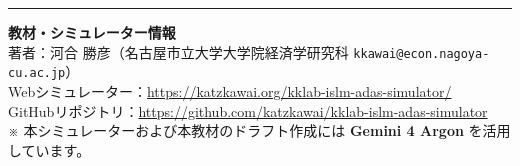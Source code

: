 \documentclass[lualatex,a4paper,11pt,ja=standard]{bxjsarticle}
\begin{document}
\vfill
\noindent\begin{minipage}[b]{\linewidth}
\rule{\linewidth}{0.4pt}
{\footnotesize
\noindent
\textbf{教材・シミュレーター情報}\\
著者：河合 勝彦（名古屋市立大学大学院経済学研究科 \texttt{kkawai@econ.nagoya-cu.ac.jp}）\\
Webシミュレーター：\url{https://katzkawai.org/kklab-islm-adas-simulator/}\\
GitHubリポジトリ：\url{https://github.com/katzkawai/kklab-islm-adas-simulator}\\
※ 本シミュレーターおよび本教材のドラフト作成には \textbf{Gemini 4 Argon} を活用しています。
}
\end{minipage}\par
\vspace*{6mm}
\end{document}
